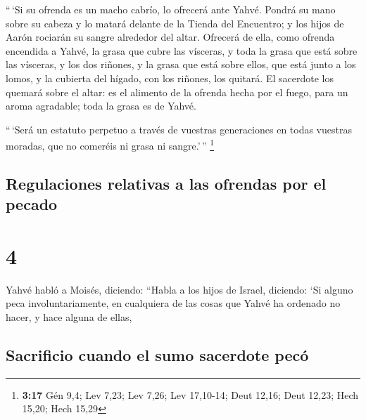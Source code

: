  ``\,`Si su ofrenda es un macho cabrío, lo ofrecerá ante
Yahvé.  Pondrá su mano sobre su cabeza y lo matará
delante de la Tienda del Encuentro; y los hijos de Aarón rociarán su
sangre alrededor del altar.  Ofrecerá de ella, como
ofrenda encendida a Yahvé, la grasa que cubre las vísceras, y toda la
grasa que está sobre las vísceras,  y los dos riñones, y
la grasa que está sobre ellos, que está junto a los lomos, y la cubierta
del hígado, con los riñones, los quitará.  El sacerdote
los quemará sobre el altar: es el alimento de la ofrenda hecha por el
fuego, para un aroma agradable; toda la grasa es de Yahvé.

 ``\,`Será un estatuto perpetuo a través de vuestras
generaciones en todas vuestras moradas, que no comeréis ni grasa ni
sangre.'\,'' \footnote{\textbf{3:17} Gén 9,4; Lev 7,23; Lev 7,26; Lev
  17,10-14; Deut 12,16; Deut 12,23; Hech 15,20; Hech 15,29}

\hypertarget{regulaciones-relativas-a-las-ofrendas-por-el-pecado}{%
\subsection{Regulaciones relativas a las ofrendas por el
pecado}\label{regulaciones-relativas-a-las-ofrendas-por-el-pecado}}

\hypertarget{section-3}{%
\section{4}\label{section-3}}

 Yahvé habló a Moisés, diciendo:  ``Habla a
los hijos de Israel, diciendo: `Si alguno peca involuntariamente, en
cualquiera de las cosas que Yahvé ha ordenado no hacer, y hace alguna de
ellas,

\hypertarget{sacrificio-cuando-el-sumo-sacerdote-pecuxf3}{%
\subsection{Sacrificio cuando el sumo sacerdote
pecó}\label{sacrificio-cuando-el-sumo-sacerdote-pecuxf3}}

